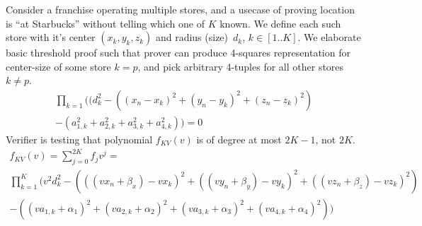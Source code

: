 \documentclass{article}
\begin{document}
Consider a franchise operating multiple stores,
and a usecase of proving location is ``at Starbucks'' without telling which one of $K$ known.
We define each such store with it's center $(x_k, y_k, z_k)$ and radius (size)~$d_k$, $k \in [1 .. K]$.
We elaborate basic threshold proof such that prover can produce
4-squares representation for center-size of some store $k=p$,
and pick arbitrary 4-tuples for all other stores $k \ne p$.
\begin{multline}
\label{eq-distn-or}
  \prod_{k=1}
    ((d_k^2 - ((x_n - x_k)^2 + (y_n - y_k)^2 + (z_n - z_k)^2) \\
     - (a_{1, k}^2 + a_{2, k}^2 + a_{3, k}^2 + a_{4, k}^2)) = 0
\end{multline}
Verifier is testing that polynomial $f_{KV}(v)$ is of degree at most $2K-1$, not $2K$.
\begin{multline}
  f_{KV}(v) = \sum_{j=0}^{2K} f_j v^j = \\
  \prod_{k=1}^{K} (
    v^2 d_k^2 - (((v x_n + \beta_x) - v x_k)^2 +
               ((v y_n + \beta_y) - v y_k)^2 +
               ((v z_n + \beta_z) - v z_k)^2)  \\
        - ((v a_{1,k} + \alpha_1)^2 +
           (v a_{2,k} + \alpha_2)^2 +
           (v a_{3,k} + \alpha_3)^2 +
           (v a_{4,k} + \alpha_4)^2) )
\end{multline}



% 


\end{document}
